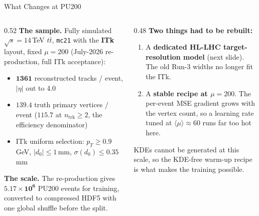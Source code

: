 \documentclass[xcolor=table,aspectratio=169]{beamer}
\newcommand{\ntrk}{\ensuremath{n_\mathrm{trk}}}
\begin{document}
\begin{frame}{What Changes at PU200}
    \begin{columns}[t]
        \begin{column}{0.52\linewidth}
            \small
            \textbf{The sample.} Fully simulated $\sqrt{s}=14$\,TeV $t\bar t$,
            \texttt{mc21} with the \textbf{ITk} layout, fixed $\mu=200$
            (July-2026 re-production, full ITk acceptance):
            \begin{itemize}\setlength\itemsep{0.25em}
                \item $\mathbf{1361}$ reconstructed tracks / event, $|\eta|$ out to 4.0
                \item $\mathbf{139.4}$ truth primary vertices / event
                    ($\mathbf{115.7}$ at $\ntrk\geq2$, the efficiency denominator)
                \item ITk uniform selection: $p_T\!\ge\!0.9$\,GeV,
                    $|d_0|\!\le\!1$\,mm, $\sigma(d_0)\!\le\!0.35$\,mm
            \end{itemize}
            \vspace{0.35em}
            \textbf{The scale.} The re-production gives
            $\mathbf{5.17\times10^{6}}$ PU200 events for training, converted to
            compressed HDF5 with one global shuffle before the split.
        \end{column}
        \begin{column}{0.48\linewidth}
            \small
            \textbf{Two things had to be rebuilt:}
            \begin{enumerate}\setlength\itemsep{0.35em}
                \item A \textbf{dedicated HL-LHC target-resolution model}
                (next slide). The old Run-3 widths no longer fit the ITk.
                \item A \textbf{stable recipe at $\mu=200$}. The per-event MSE
                gradient grows with the vertex count, so a learning rate tuned at
                $\langle\mu\rangle\!\approx\!60$ runs far too hot here.
            \end{enumerate}
            \vspace{0.35em}
            {\footnotesize\textcolor{black!55}{KDEs cannot be generated at this
            scale, so the KDE-free warm-up recipe is what makes the training
            possible.}}
        \end{column}
    \end{columns}
\end{frame}
\end{document}
